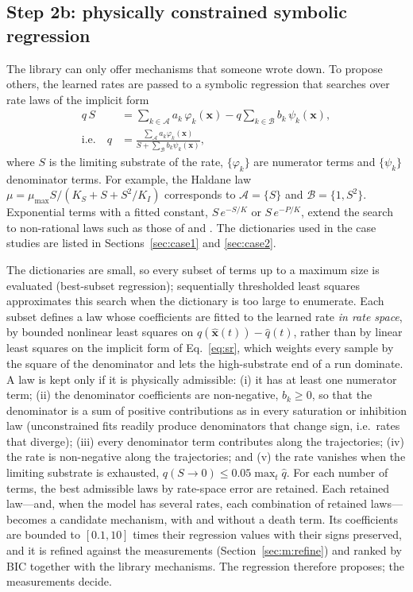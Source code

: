 \subsection{Step 2b: physically constrained symbolic regression}\label{sec:m:sr}
The library can only offer mechanisms that someone wrote down. To propose others, the learned rates are passed to a symbolic regression that searches over rate laws of the implicit form \citep{Mangan2016,Kaheman2020}
\begin{equation}
\begin{aligned}
q\,S &= \sum_{k\in\mathcal{A}} a_k\,\varphi_k(\mathbf{x}) - q\sum_{k\in\mathcal{B}} b_k\,\psi_k(\mathbf{x}),\\
\text{i.e.}\quad q &= \frac{\sum_{\mathcal{A}} a_k\varphi_k(\mathbf{x})}{S + \sum_{\mathcal{B}} b_k \psi_k(\mathbf{x})},
\end{aligned}
\label{eq:sr}
\end{equation}
where $S$ is the limiting substrate of the rate, $\{\varphi_k\}$ are numerator terms and $\{\psi_k\}$ denominator terms. For example, the Haldane law $\mu=\mu_{\max}S/(K_S+S+S^2/K_I)$ corresponds to $\mathcal{A}=\{S\}$ and $\mathcal{B}=\{1,S^2\}$. Exponential terms with a fitted constant, $S\,e^{-S/K}$ or $S\,e^{-P/K}$, extend the search to non-rational laws such as those of \citet{Teissier1942} and \citet{Aiba1968}. The dictionaries used in the case studies are listed in Sections~\ref{sec:case1} and \ref{sec:case2}.

The dictionaries are small, so every subset of terms up to a maximum size is evaluated (best-subset regression); sequentially thresholded least squares \citep{Brunton2016} approximates this search when the dictionary is too large to enumerate. Each subset defines a law whose coefficients are fitted to the learned rate \emph{in rate space}, by bounded nonlinear least squares on $q(\hat{\mathbf{x}}(t)) - \hat{q}(t)$, rather than by linear least squares on the implicit form of Eq.~\eqref{eq:sr}, which weights every sample by the square of the denominator and lets the high-substrate end of a run dominate. A law is kept only if it is physically admissible:
(i) it has at least one numerator term;
(ii) the denominator coefficients are non-negative, $b_k\ge 0$, so that the denominator is a sum of positive contributions as in every saturation or inhibition law (unconstrained fits readily produce denominators that change sign, i.e.\ rates that diverge);
(iii) every denominator term contributes along the trajectories;
(iv) the rate is non-negative along the trajectories; and
(v) the rate vanishes when the limiting substrate is exhausted, $q(S\to 0)\le 0.05\max_t\hat{q}$.
For each number of terms, the best admissible laws by rate-space error are retained. Each retained law---and, when the model has several rates, each combination of retained laws---becomes a candidate mechanism, with and without a death term. Its coefficients are bounded to $[0.1, 10]$ times their regression values with their signs preserved, and it is refined against the measurements (Section~\ref{sec:m:refine}) and ranked by BIC together with the library mechanisms. The regression therefore proposes; the measurements decide.

